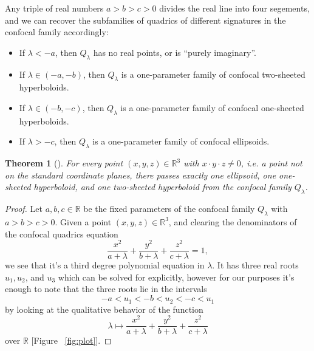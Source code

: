 \documentclass[10pt, a4paper]{article}
\theoremstyle{BoldTopSpacing}
\newtheorem{theorem}{Theorem}[section]
\theoremstyle{BoldTopSpacing}
\theoremstyle{BoldTopSpacing}
\theoremstyle{BoldTopBottomSpacing}
\theoremstyle{BoldTopSpacing}
\theoremstyle{BoldTopBottomSpacing}
\theoremstyle{remark}
\begin{document}
Any triple of real numbers $a > b > c > 0$ divides the real line into four segements, and we can recover the subfamilies of quadrics of different signatures in the confocal family accordingly:

\begin{itemize}
    \item If $\lambda < -a$, then $Q_{\lambda}$ has no real points, or is \enquote{purely imaginary}.
    \item If $\lambda \in (-a, -b)$, then $Q_{\lambda}$ is a one-parameter family of confocal two-sheeted hyperboloids.
    \item If $\lambda \in (-b, -c)$, then $Q_{\lambda}$ is a one-parameter family of confocal one-sheeted hyperboloids.
    \item If $\lambda > -c$, then $Q_{\lambda}$ is a one-parameter family of confocal ellipsoids. \par
\end{itemize}

\begin{theorem}[]
\label{thm:fill-up-euclidean-space}
For every point $(x, y, z) \in \mathbb{R}^3$ with $x \cdot y \cdot z \neq 0$, i.e. a point not on the standard coordinate planes, there passes exactly one ellipsoid, one one-sheeted hyperboloid, and one two-sheeted hyperboloid from the confocal family $Q_{\lambda}$.
\end{theorem}

\begin{proof}
    Let $a, b, c \in \mathbb{R}$ be the fixed parameters of the confocal family $Q_{\lambda}$ with $a > b > c > 0$. Given a point $(x, y, z) \in \mathbb{R}^3$, and clearing the denominators of the confocal quadrics equation
\[
    \frac{x^2}{a + \lambda} + \frac{y^2}{b + \lambda} + \frac{z^2}{c + \lambda} = 1,
\]
we see that it's a third degree polynomial equation in $\lambda$. It has three real roots $u_{1}, u_{2}$, and $u_{3}$ which can be solved for explicitly, however for our purposes it's enough to note that the three roots lie in the intervals
\[
    -a < u_{1} < -b < u_{2} < -c < u_{1}
\]
by looking at the qualitative behavior of the function
\[
    \lambda \mapsto \frac{x^2}{a + \lambda} + \frac{y^2}{b + \lambda} + \frac{z^2}{c + \lambda}
\]
over $\mathbb{R}$ [Figure ~\ref{fig:plot}].
\end{proof}
\end{document}
